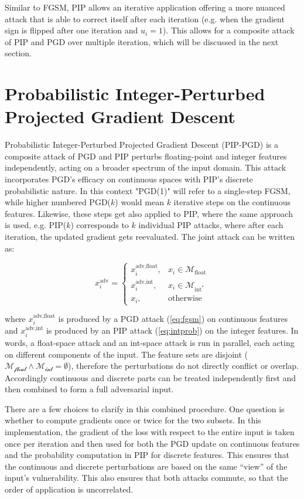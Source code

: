 Similar to FGSM, PIP allows an iterative application offering a more nuanced attack that is able to correct itself after each iteration (e.g. when the gradient sign is flipped after one iteration and $u_i=1$). This allows for a composite attack of PIP and PGD over multiple iteration, which will be discussed in the next section. 

\section{Probabilistic Integer-Perturbed Projected Gradient Descent}
\label{sec:method_combined}

Probabilistic Integer-Perturbed Projected Gradient Descent (PIP-PGD) is a composite attack of PGD and PIP perturbs floating-point and integer features independently, acting on a broader spectrum of the input domain. This attack incorporates PGD's efficacy on continuous spaces with PIP's discrete probabilistic nature. In this context "PGD(1)" will refer to a single-step FGSM, while higher numbered PGD($k$) would mean $k$ iterative steps on the continuous features. Likewise, these steps get also applied to PIP, where the same approach is used, e.g. PIP($k$) corresponds to $k$ individual PIP attacks, where after each iteration, the updated gradient gets reevaluated. The joint attack can be written as:

\begin{equation}
x_i^{\text{adv}} = 
    \begin{cases} 
    x^{\text{adv,float}}_i, & x_i\in\mathcal{M}_{\text{float}} \\[4pt]
    x^{\text{adv,int}}_i,   & x_i\in\mathcal{M}_{\text{int}^*}   \\[4pt]
    x_i, & \text{otherwise}
    \end{cases}
\label{eq:joint_attack}
\end{equation}

where $x^{\text{adv,float}}_i$ is produced by a PGD attack (\ref{eq:fgsm}) on continuous features and $x^{\text{adv,int}}_i$ is produced by an PIP attack (\ref{eq:intprob}) on the integer features. In words, a float-space attack and an int-space attack is run in parallel, each acting on different components of the input. The feature sets are disjoint ($\mathcal{M_{\text{float}}} \wedge \mathcal{M_{\text{int}}}=\emptyset$), therefore the perturbations do not directly conflict or overlap. Accordingly continuous and discrete parts can be treated independently first and then combined to form a full adversarial input.

There are a few choices to clarify in this combined procedure. One question is whether to compute gradients once or twice for the two subsets. In this implementation, the gradient of the loss with respect to the entire input is taken once per iteration and then used for both the PGD update on continuous features and the probability computation in PIP for discrete features. This ensures that the continuous and discrete perturbations are based on the same “view” of the input’s vulnerability. This also ensures that both attacks commute, so that the order of application is uncorrelated.